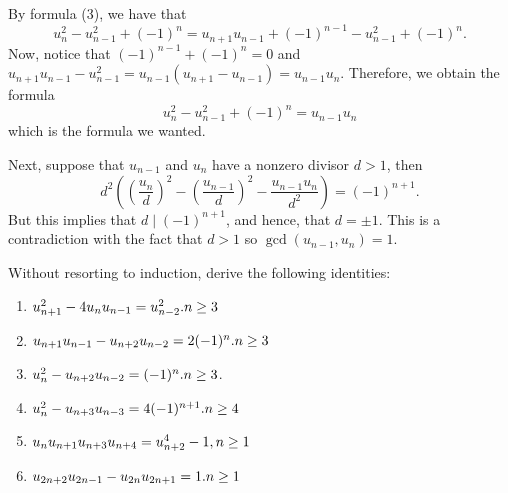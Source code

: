 \begin{solution}
    By formula (3), we have that
    $$u_n^2 - u_{n-1}^2 + (-1)^n = u_{n+1}u_{n-1} + (-1)^{n-1} - u_{n-1}^2 + (-1)^n.$$
    Now, notice that $(-1)^{n-1} + (-1)^n = 0$ and $u_{n+1}u_{n-1} - u_{n-1}^2 = u_{n-1}(u_{n+1} - u_{n-1}) = u_{n-1}u_n$. Therefore, we obtain the formula
    $$u_n^2 - u_{n-1}^2 + (-1)^n = u_{n-1}u_n$$
    which is the formula we wanted.
    
    Next, suppose that $u_{n-1}$ and $u_n$ have a nonzero divisor $d > 1$, then
    $$d^2\left(\left(\frac{u_n}{d}\right)^2 - \left(\frac{u_{n-1}}{d}\right)^2 - \frac{u_{n-1}u_n}{d^2}\right) = (-1)^{n+1}.$$
    But this implies that $d \mid (-1)^{n+1}$, and hence, that $d = \pm 1$. This is a contradiction with the fact that $d > 1$ so $\gcd(u_{n-1}, u_n) = 1$. \\
\end{solution}

\begin{exercise}
    Without resorting to induction, derive the following identities:
    \begin{enumerate}
        \item $u_{n+1}^2 - 4u_n u_{n-1} = u_{n-2}^2. \hfill n\geq 3$
        
        \item $u_{n+1}u_{n-1} - u_{n+2}u_{n-2} = 2(-1)^n. \hfill n\geq 3$
        
        \item $u_n^2 - u_{n+2}u_{n-2} = (-1)^n. \hfill n\geq 3$.
        
        \item $u_n^2 - u_{n+3}u_{n-3} = 4(-1)^{n+1}. \hfill n\geq 4$
        \item $u_nu_{n+1}u_{n+3}u_{n+4} = u_{n+2}^4 - 1, \hfill n\geq 1$
        
        \item $u_{2n+2}u_{2n-1} - u_{2n}u_{2n+1} = 1. \hfill n \geq 1$ \\
    \end{enumerate}
\end{exercise}

